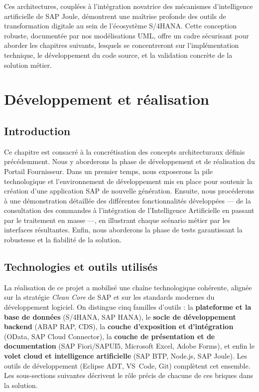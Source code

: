 \documentclass[12pt,a4paper,oneside]{report}
\begin{document}
Ces architectures, couplées à l'intégration novatrice des mécanismes d'intelligence artificielle de SAP Joule, démontrent une maîtrise profonde des outils de transformation digitale au sein de l'écosystème S/4HANA. Cette conception robuste, documentée par nos modélisations UML, offre un cadre sécurisant pour aborder les chapitres suivants, lesquels se concentreront sur l'implémentation technique, le développement du code source, et la validation concrète de la solution métier.

\chapter{D\'eveloppement et r\'ealisation}\label{ch:dev-real}
\section{Introduction}\label{ch5:introduction}
Ce chapitre est consacré à la concrétisation des concepts architecturaux définis précédemment. Nous y aborderons la phase de développement et de réalisation du Portail Fournisseur. Dans un premier temps, nous exposerons la pile technologique et l'environnement de développement mis en place pour soutenir la création d'une application SAP de nouvelle génération. Ensuite, nous procéderons à une démonstration détaillée des différentes fonctionnalités développées — de la consultation des commandes à l'intégration de l'Intelligence Artificielle en passant par le traitement en masse —, en illustrant chaque scénario métier par les interfaces résultantes. Enfin, nous aborderons la phase de tests garantissant la robustesse et la fiabilité de la solution.

\section{Technologies et outils utilis\'es}\label{ch5:tech}
La réalisation de ce projet a mobilisé une chaîne technologique cohérente, alignée sur la
stratégie \textit{Clean Core} de SAP et sur les standards modernes du développement
logiciel. On distingue cinq familles d'outils : la \textbf{plateforme et la base de
données} (S/4HANA, SAP HANA), le \textbf{socle de développement backend} (ABAP RAP, CDS),
la \textbf{couche d'exposition et d'intégration} (OData, SAP Cloud Connector), la
\textbf{couche de présentation et de documentation} (SAP Fiori/SAPUI5, Microsoft Excel,
Adobe Forms), et enfin le \textbf{volet cloud et intelligence artificielle} (SAP BTP,
Node.js, SAP Joule). Les outils de développement (Eclipse ADT, VS~Code, Git) complètent
cet ensemble. Les sous-sections suivantes décrivent le rôle précis de chacune de ces
briques dans la solution.
\end{document}
